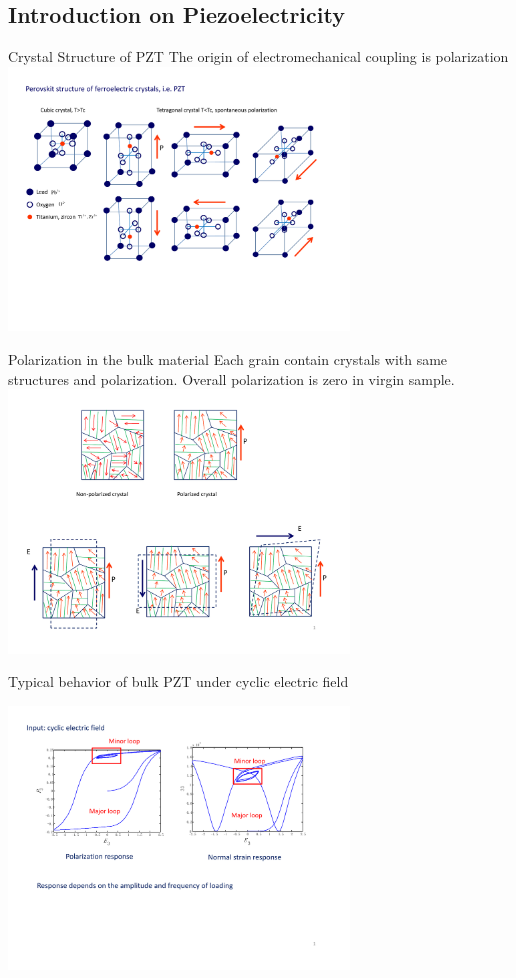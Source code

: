 \documentclass{beamer}
\begin{document}
\subsection{Introduction on Piezoelectricity}
\begin{frame}{Crystal Structure of PZT}
The origin of electromechanical coupling is polarization
\includegraphics[height=7cm]{../images/piezo_electric_basics} \\ 
\end{frame} 

\begin{frame}{Polarization in the bulk material}
Each grain contain crystals with same structures and polarization.
Overall polarization is zero in virgin sample.
\includegraphics[height=7cm]{../images/grain_polarization_piezo_electric.pdf}\\ 
\end{frame}

\begin{frame}{Typical behavior of bulk PZT under cyclic electric field} 

\centering
\includegraphics[height=7cm]{../images/polariztion_and_stress_response.pdf}\\ 
\end{frame}
\end{document}
